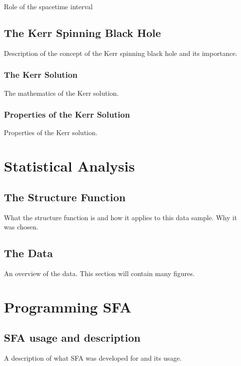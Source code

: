 \documentclass[12pt, oneside]{smuthesis}
\begin{document}
Role of the spacetime interval

\section{\sc The Kerr Spinning Black Hole}

Description of the concept of the Kerr spinning black hole and its importance.

\subsection{\sc The Kerr Solution}

The mathematics of the Kerr solution.

\subsection{\sc Properties of the Kerr Solution}

Properties of the Kerr solution.

\chapter{\sc Statistical Analysis}

\section{\sc The Structure Function}

\citep{collier2001}
\citep{test1}
\citep{test2}
What the structure function is and how it applies to this data sample. Why it was chosen.

\section{\sc The Data}

An overview of the data. This section will contain many figures.

\chapter{\sc Programming SFA}

\section{\sc SFA usage and description}

A description of what SFA was developed for and its usage.
\end{document}
